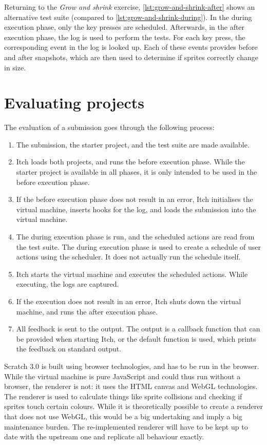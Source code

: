 \documentclass[../main]{subfiles}
\begin{document}
Returning to the \emph{Grow and shrink} exercise, \cref{lst:grow-and-shrink-after} shows an alternative test suite (compared to \cref{lst:grow-and-shrink-during}).
In the during execution phase, only the key presses are scheduled.
Afterwards, in the after execution phase, the log is used to perform the tests.
For each key press, the corresponding event in the log is looked up.
Each of these events provides before and after snapshots, which are then used to determine if sprites correctly change in size.

\section{Evaluating projects}\label{sec:itch-evaluating-projects}

The evaluation of a submission goes through the following process:

\begin{enumerate}
    \item The submission, the starter project, and the test suite are made available.
    \item Itch loads both projects, and runs the before execution phase.
        While the starter project is available in all phases, it is only intended to be used in the before execution phase.
    \item If the before execution phase does not result in an error, Itch initialises the virtual machine, inserts hooks for the log, and loads the submission into the virtual machine.
    \item The during execution phase is run, and the scheduled actions are read from the test suite.
        The during execution phase is used to create a schedule of user actions using the scheduler.
        It does not actually run the schedule itself.
    \item Itch starts the virtual machine and executes the scheduled actions.
          While executing, the logs are captured.
    \item If the execution does not result in an error, Itch shuts down the virtual machine, and runs the after execution phase.
    \item All feedback is sent to the output.
        The output is a callback function that can be provided when starting Itch, or the default function is used, which prints the feedback on standard output.
\end{enumerate}

Scratch 3.0 is built using browser technologies, and has to be run in the browser.
While the virtual machine is pure JavaScript and could thus run without a browser, the renderer is not: it uses the HTML canvas and WebGL technologies.
The renderer is used to calculate things like sprite collisions and checking if sprites touch certain colours.
While it is theoretically possible to create a renderer that does not use WebGL, this would be a big undertaking and imply a big maintenance burden.
The re-implemented renderer will have to be kept up to date with the upstream one and replicate all behaviour exactly.
\end{document}
